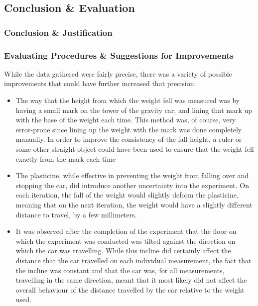 \documentclass[titlepage,12pt]{article}
\begin{document}
\FloatBarrier

\subsection{Conclusion \& Evaluation}

\subsubsection{Conclusion \& Justification}

\subsubsection{Evaluating Procedures \& Suggestions for Improvements}

While the data gathered were fairly precise, there was a variety of possible improvements
that could have further increased that precision:

\begin{itemize}
    \item The way that the height from which the weight fell was measured was by having a
        small mark on the tower of the gravity car, and  lining that mark up with the base
        of the weight each time. This method was, of course, very error-prone since lining
        up the weight with the mark was done completely manually. In order to improve the
        consistency of the fall height, a ruler or some other straight object could have
        been used to ensure that the weight fell exactly from the mark each time

    \item The plasticine, while effective in preventing the weight from falling over and
        stopping the car, did introduce another uncertainty into the experiment. On each
        iteration, the fall of the weight would slightly deform the plasticine, meaning that
        on the next iteration, the weight would have a slightly different distance to
        travel, by a few millimeters. 

    \item It was observed after the completion of the experiment that the floor on which the
        experiment was conducted was tilted against the direction on which the car was
        travelling. While this incline did certainly affect the distance that the car
        travelled on each individual measurement, the fact that the incline was constant and
        that the car was, for all measurements, travelling in the same direction, meant that
        it most likely did not affect the overall behaviour of the distance travelled by the
        car relative to the weight used.  
\end{itemize}
\end{document}

